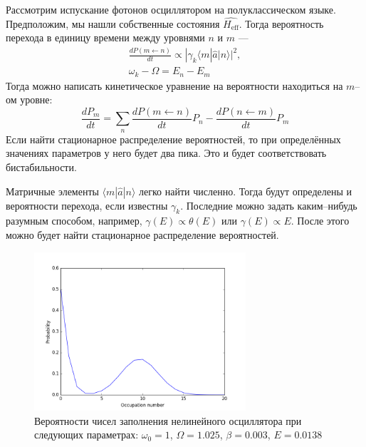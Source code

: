 \documentclass{article}
\begin{document}
Рассмотрим испускание фотонов осциллятором на полуклассическом языке. Предположим, мы нашли
собственные состояния $\hat{H_\mathrm{eff}}$. Тогда вероятность перехода в единицу времени
 между уровнями
$n$ и $m$ ---
\begin{equation}
    \begin{gathered}
        \frac{dP(m \leftarrow n)}{dt} \propto | \gamma_k \langle m | \hat{a} | n \rangle|^2,\\
        \omega_k - \Omega = E_n - E_m
    \end{gathered}
\end{equation}
Тогда можно написать кинетическое уравнение на вероятности находиться на $m$--ом уровне:
\begin{equation}
    \frac{dP_m}{dt} = \sum_n \frac{dP(m \leftarrow n)}{dt} P_n - \frac{dP(n \leftarrow m)}{dt} P_m
\end{equation}
Если найти стационарное распределение вероятностей, то при определённых значениях параметров 
у него будет два пика. Это и будет соответствовать бистабильности.

Матричные элементы $ \langle m | \hat{a} | n \rangle$ легко найти численно. Тогда будут
определены и вероятности перехода, если известны $\gamma_k$. Последние можно задать
каким--нибудь разумным способом, например, $\gamma(E) \propto \theta(E)$ или
$\gamma(E) \propto E$. После этого можно будет найти стационарное распределение вероятностей.

\begin{figure}[h]
    \centering
    \includegraphics[width=0.7\textwidth]{bistability.png}
    \caption{Вероятности чисел заполнения нелинейного осциллятора при следующих параметрах:
             $\omega_0 = 1$,
             $\Omega=1.025$,
             $\beta=0.003$,
             $E=0.0138$}
\end{figure}
\end{document}
